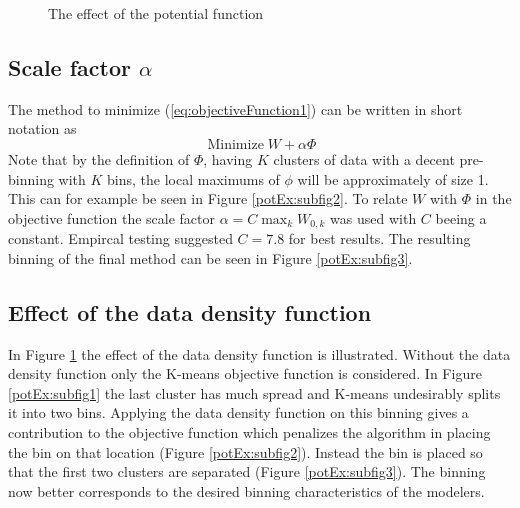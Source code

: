 \begin{figure}[!ht]
{\label{potEx:subfig2}
}
\caption[]{The effect of the potential function}
\label{potEx}
\end{figure}

\subsection{Scale factor $\alpha$}
The method to minimize (\ref{eq:objectiveFunction1}) can be written in short notation as
\begin{equation}
	\operatorname{Minimize} W + \alpha\Phi
	\label{eq:Method1}
\end{equation}
Note that by the definition of $\Phi$, having $K$ clusters of data with a decent pre-binning with $K$ bins, the local maximums of $\phi$ will be approximately of size 1. This can for example be seen in Figure \ref{potEx:subfig2}. To relate $W$ with $\Phi$ in the objective function the scale factor $\alpha=C\max_k{W_{0,k}}$ was used with $C$ beeing a constant. Empircal testing suggested $C=7.8$ for best results. The resulting binning of the final method can be seen in Figure \ref{potEx:subfig3}.


\subsection{Effect of the data density function}
In Figure \ref{potEx} the effect of the data density function is illustrated. Without the data density function only the K-means objective function is considered. In Figure \ref{potEx:subfig1} the last cluster has much spread and K-means undesirably splits it into two bins. Applying the data density function on this binning gives a contribution to the objective function which penalizes the algorithm in placing the bin on that location (Figure \ref{potEx:subfig2}). Instead the bin is placed so that the first two clusters are separated (Figure \ref{potEx:subfig3}). The binning now  better corresponds to the desired binning characteristics of the modelers.
\



